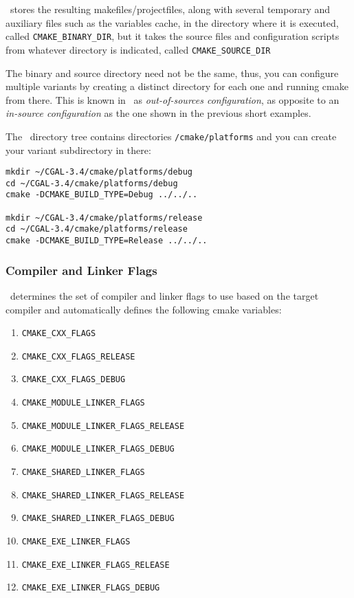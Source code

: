 \cmake\ stores the resulting makefiles/projectfiles, along with several temporary and auxiliary files such
as the variables cache, in the directory where it is executed, called \texttt{CMAKE\_BINARY\_DIR}, but it
takes the source files and configuration scripts from whatever directory is indicated, called
\texttt{CMAKE\_SOURCE\_DIR} 

The binary and source directory need not be the same, thus, you can configure multiple variants by creating a
distinct directory for each one and running cmake from there. This is known in \cmake\ as 
{\em out-of-sources configuration}, as opposite to an {\em in-source configuration} as the one shown in the 
previous short examples.

The \cgal\ directory tree contains directories \cgaldir{}\texttt{/cmake/platforms} and you can create your 
variant subdirectory in there:

{\ccTexHtml{\scriptsize}{}
\begin{verbatim}
mkdir ~/CGAL-3.4/cmake/platforms/debug
cd ~/CGAL-3.4/cmake/platforms/debug
cmake -DCMAKE_BUILD_TYPE=Debug ../../..

mkdir ~/CGAL-3.4/cmake/platforms/release
cd ~/CGAL-3.4/cmake/platforms/release
cmake -DCMAKE_BUILD_TYPE=Release ../../..
\end{verbatim}
}

\subsubsection{Compiler and Linker Flags}

\cmake\ determines the set of compiler and linker flags to use based on the target compiler and automatically defines
the following cmake variables:

\begin{enumerate}
\item \texttt{CMAKE\_CXX\_FLAGS}
\item \texttt{CMAKE\_CXX\_FLAGS\_RELEASE}
\item \texttt{CMAKE\_CXX\_FLAGS\_DEBUG}
\item \texttt{CMAKE\_MODULE\_LINKER\_FLAGS}
\item \texttt{CMAKE\_MODULE\_LINKER\_FLAGS\_RELEASE}
\item \texttt{CMAKE\_MODULE\_LINKER\_FLAGS\_DEBUG}
\item \texttt{CMAKE\_SHARED\_LINKER\_FLAGS}
\item \texttt{CMAKE\_SHARED\_LINKER\_FLAGS\_RELEASE}
\item \texttt{CMAKE\_SHARED\_LINKER\_FLAGS\_DEBUG}
\item \texttt{CMAKE\_EXE\_LINKER\_FLAGS}
\item \texttt{CMAKE\_EXE\_LINKER\_FLAGS\_RELEASE}
\item \texttt{CMAKE\_EXE\_LINKER\_FLAGS\_DEBUG}
\end{enumerate}


